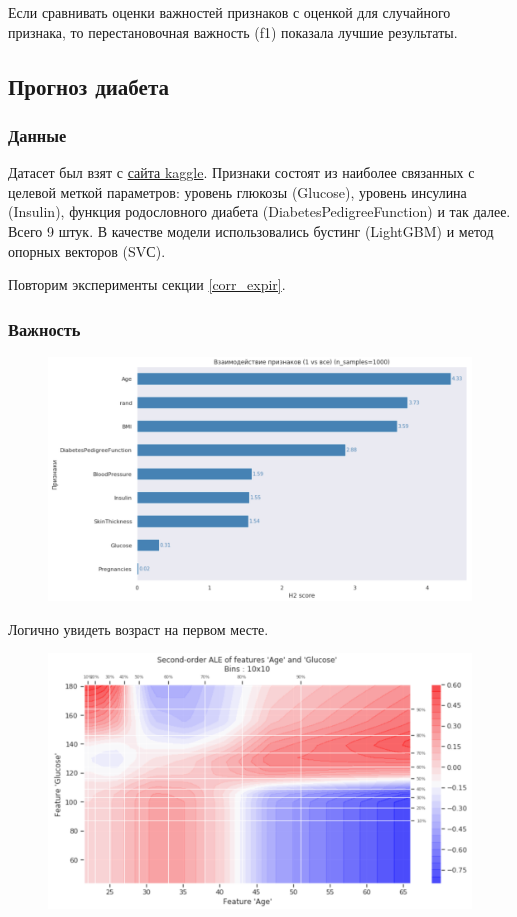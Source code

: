 \documentclass[12pt]{article}
\begin{document}
Если сравнивать оценки важностей признаков с оценкой для случайного признака, то перестановочная важность (f1) показала лучшие результаты.
\newpage
\subsection{Прогноз диабета}
\subsubsection{Данные}
Датасет был взят с \href{https://www.kaggle.com/uciml/pima-indians-diabetes-database}{сайта kaggle}. Признаки состоят из наиболее связанных с целевой меткой параметров: уровень глюкозы (Glucose), уровень инсулина (Insulin), функция родословного диабета (DiabetesPedigreeFunction) и так далее. Всего 9 штук. В качестве модели использовались бустинг (LightGBM) и метод опорных векторов (SVС).

Повторим эксперименты секции \ref{corr_expir}.

\subsubsection{Важность}\label{diab_imortance}

\begin{figure}[h]
\centering
\includegraphics[width=140mm]{images/h2_diab.png}
\end{figure}

Логично увидеть возраст на первом месте.

\begin{figure}[h]
\centering
\includegraphics[width=130mm]{images/glucose_diab.png}
\end{figure}
\end{document}
